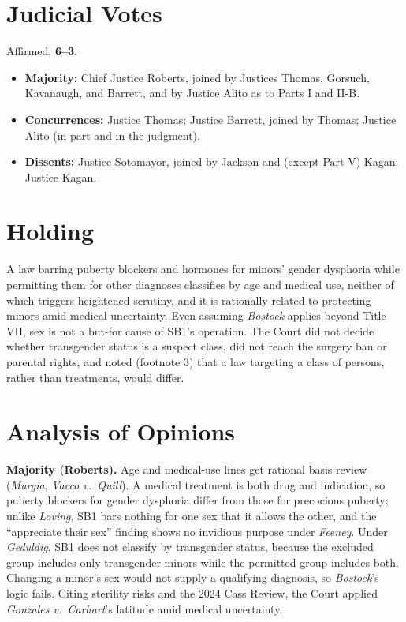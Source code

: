 \documentclass[12pt]{article}
\begin{document}
\section{Judicial Votes}

Affirmed, \textbf{6--3}.
\begin{itemize}
\item \textbf{Majority:} Chief Justice Roberts, joined by Justices Thomas, Gorsuch, Kavanaugh, and Barrett, and by Justice Alito as to Parts I and II-B.
\item \textbf{Concurrences:} Justice Thomas; Justice Barrett, joined by Thomas; Justice Alito (in part and in the judgment).
\item \textbf{Dissents:} Justice Sotomayor, joined by Jackson and (except Part V) Kagan; Justice Kagan.
\end{itemize}

\section{Holding}

A law barring puberty blockers and hormones for minors' gender dysphoria while permitting them for other diagnoses classifies by age and medical use, neither of which triggers heightened scrutiny, and it is rationally related to protecting minors amid medical uncertainty. Even assuming \textit{Bostock} applies beyond Title VII, sex is not a but-for cause of SB1's operation. The Court did not decide whether transgender status is a suspect class, did not reach the surgery ban or parental rights, and noted (footnote 3) that a law targeting a class of persons, rather than treatments, would differ.

\section{Analysis of Opinions}

\textbf{Majority (Roberts).} Age and medical-use lines get rational basis review (\textit{Murgia}, \textit{Vacco v.\ Quill}). A medical treatment is both drug and indication, so puberty blockers for gender dysphoria differ from those for precocious puberty; unlike \textit{Loving}, SB1 bars nothing for one sex that it allows the other, and the ``appreciate their sex'' finding shows no invidious purpose under \textit{Feeney}. Under \textit{Geduldig}, SB1 does not classify by transgender status, because the excluded group includes only transgender minors while the permitted group includes both. Changing a minor's sex would not supply a qualifying diagnosis, so \textit{Bostock}'s logic fails. Citing sterility risks and the 2024 Cass Review, the Court applied \textit{Gonzales v.\ Carhart}'s latitude amid medical uncertainty.
\end{document}
